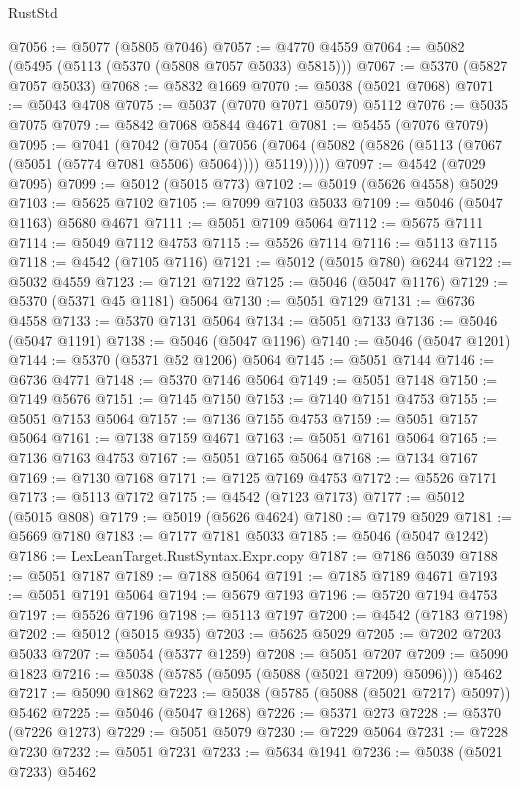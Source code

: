 \begin{lexlean}{RustStd}
\begin{coremodule}
@7056 := @5077 (@5805 @7046)
@7057 := @4770 @4559
@7064 := @5082 (@5495 (@5113 (@5370 (@5808 @7057 @5033) @5815)))
@7067 := @5370 (@5827 @7057 @5033)
@7068 := @5832 @1669
@7070 := @5038 (@5021 @7068)
@7071 := @5043 @4708
@7075 := @5037 (@7070 @7071 @5079) @5112
@7076 := @5035 @7075
@7079 := @5842 @7068 @5844 @4671
@7081 := @5455 (@7076 @7079)
@7095 := @7041
    (@7042
      (@7054
        (@7056 (@7064 (@5082 (@5826 (@5113 (@7067 (@5051 (@5774 @7081 @5506) @5064)))) @5119)))))
@7097 := @4542 (@7029 @7095)
@7099 := @5012 (@5015 @773)
@7102 := @5019 (@5626 @4558) @5029
@7103 := @5625 @7102
@7105 := @7099 @7103 @5033
@7109 := @5046 (@5047 @1163) @5680 @4671
@7111 := @5051 @7109 @5064
@7112 := @5675 @7111
@7114 := @5049 @7112 @4753
@7115 := @5526 @7114
@7116 := @5113 @7115
@7118 := @4542 (@7105 @7116)
@7121 := @5012 (@5015 @780) @6244
@7122 := @5032 @4559
@7123 := @7121 @7122
@7125 := @5046 (@5047 @1176)
@7129 := @5370 (@5371 @45 @1181) @5064
@7130 := @5051 @7129
@7131 := @6736 @4558
@7133 := @5370 @7131 @5064
@7134 := @5051 @7133
@7136 := @5046 (@5047 @1191)
@7138 := @5046 (@5047 @1196)
@7140 := @5046 (@5047 @1201)
@7144 := @5370 (@5371 @52 @1206) @5064
@7145 := @5051 @7144
@7146 := @6736 @4771
@7148 := @5370 @7146 @5064
@7149 := @5051 @7148
@7150 := @7149 @5676
@7151 := @7145 @7150
@7153 := @7140 @7151 @4753
@7155 := @5051 @7153 @5064
@7157 := @7136 @7155 @4753
@7159 := @5051 @7157 @5064
@7161 := @7138 @7159 @4671
@7163 := @5051 @7161 @5064
@7165 := @7136 @7163 @4753
@7167 := @5051 @7165 @5064
@7168 := @7134 @7167
@7169 := @7130 @7168
@7171 := @7125 @7169 @4753
@7172 := @5526 @7171
@7173 := @5113 @7172
@7175 := @4542 (@7123 @7173)
@7177 := @5012 (@5015 @808)
@7179 := @5019 (@5626 @4624)
@7180 := @7179 @5029
@7181 := @5669 @7180
@7183 := @7177 @7181 @5033
@7185 := @5046 (@5047 @1242)
@7186 := LexLeanTarget.RustSyntax.Expr.copy
@7187 := @7186 @5039
@7188 := @5051 @7187
@7189 := @7188 @5064
@7191 := @7185 @7189 @4671
@7193 := @5051 @7191 @5064
@7194 := @5679 @7193
@7196 := @5720 @7194 @4753
@7197 := @5526 @7196
@7198 := @5113 @7197
@7200 := @4542 (@7183 @7198)
@7202 := @5012 (@5015 @935)
@7203 := @5625 @5029
@7205 := @7202 @7203 @5033
@7207 := @5054 (@5377 @1259)
@7208 := @5051 @7207
@7209 := @5090 @1823
@7216 := @5038 (@5785 (@5095 (@5088 (@5021 @7209) @5096))) @5462
@7217 := @5090 @1862
@7223 := @5038 (@5785 (@5088 (@5021 @7217) @5097)) @5462
@7225 := @5046 (@5047 @1268)
@7226 := @5371 @273
@7228 := @5370 (@7226 @1273)
@7229 := @5051 @5079
@7230 := @7229 @5064
@7231 := @7228 @7230
@7232 := @5051 @7231
@7233 := @5634 @1941
@7236 := @5038 (@5021 @7233) @5462

\end{coremodule}
\end{lexlean}
